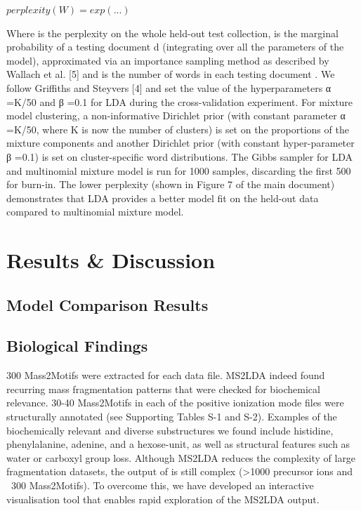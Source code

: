 $perplexity(W)=exp(...)$

Where  is the perplexity on the whole held-out test collection,  is the marginal probability of a testing document d (integrating over all the parameters of the model), approximated via an importance sampling method as described by Wallach et al. [5] and  is the number of words in each testing document . We follow Griffiths and Steyvers [4] and set the value of the hyperparameters α =K/50 and β =0.1 for LDA during the cross-validation experiment. For mixture model clustering, a non-informative Dirichlet prior (with constant parameter α =K/50, where K is now the number of clusters) is set on the proportions of the mixture components and another Dirichlet prior (with constant hyper-parameter β =0.1) is set on cluster-specific word distributions. The Gibbs sampler for LDA and multinomial mixture model is run for 1000 samples, discarding the first 500 for burn-in. The lower perplexity (shown in Figure 7 of the main document) demonstrates that LDA provides a better model fit on the held-out data compared to multinomial mixture model.

\section{Results \& Discussion}

\subsection{Model Comparison Results}

\subsection{Biological Findings}

300 Mass2Motifs were extracted for each data file. MS2LDA indeed found recurring mass fragmentation patterns that were checked for biochemical relevance. 30-40 Mass2Motifs in each of the positive ionization mode files were structurally annotated (see Supporting Tables S-1 and S-2). Examples of the biochemically relevant and diverse substructures we found include histidine, phenylalanine, adenine, and a hexose-unit, as well as structural features such as water or carboxyl group loss. Although MS2LDA reduces the complexity of large fragmentation datasets, the output of is still complex (>1000 precursor ions and ~300 Mass2Motifs). To overcome this, we have developed an interactive visualisation tool that enables rapid exploration of the MS2LDA output. 

